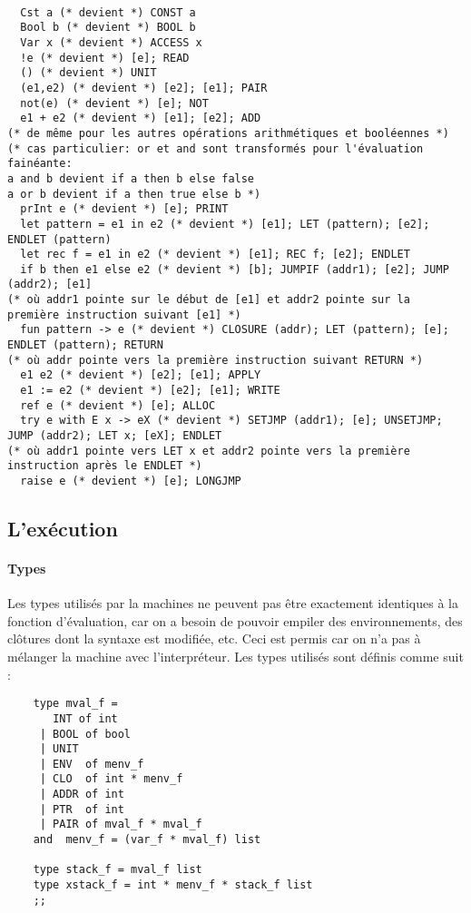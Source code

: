 \documentclass{article}
\begin{document}
\begin{verbatim}

  Cst a (* devient *) CONST a
  Bool b (* devient *) BOOL b
  Var x (* devient *) ACCESS x
  !e (* devient *) [e]; READ
  () (* devient *) UNIT
  (e1,e2) (* devient *) [e2]; [e1]; PAIR
  not(e) (* devient *) [e]; NOT
  e1 + e2 (* devient *) [e1]; [e2]; ADD
(* de même pour les autres opérations arithmétiques et booléennes *)
(* cas particulier: or et and sont transformés pour l'évaluation fainéante: 
a and b devient if a then b else false
a or b devient if a then true else b *)
  prInt e (* devient *) [e]; PRINT
  let pattern = e1 in e2 (* devient *) [e1]; LET (pattern); [e2]; ENDLET (pattern)
  let rec f = e1 in e2 (* devient *) [e1]; REC f; [e2]; ENDLET
  if b then e1 else e2 (* devient *) [b]; JUMPIF (addr1); [e2]; JUMP (addr2); [e1]
(* où addr1 pointe sur le début de [e1] et addr2 pointe sur la première instruction suivant [e1] *)
  fun pattern -> e (* devient *) CLOSURE (addr); LET (pattern); [e]; ENDLET (pattern); RETURN
(* où addr pointe vers la première instruction suivant RETURN *)
  e1 e2 (* devient *) [e2]; [e1]; APPLY
  e1 := e2 (* devient *) [e2]; [e1]; WRITE
  ref e (* devient *) [e]; ALLOC
  try e with E x -> eX (* devient *) SETJMP (addr1); [e]; UNSETJMP; JUMP (addr2); LET x; [eX]; ENDLET
(* où addr1 pointe vers LET x et addr2 pointe vers la première instruction après le ENDLET *)
  raise e (* devient *) [e]; LONGJMP

\end{verbatim}

\subsection{L'exécution}

	\paragraph{Types} Les types utilisés par la machines ne peuvent pas être exactement identiques à la fonction d'évaluation, car on a besoin de pouvoir empiler des environnements, des clôtures dont la syntaxe est modifiée, etc. Ceci est permis car on n'a pas à mélanger la machine avec l'interpréteur. Les types utilisés sont définis comme suit :
	
	\begin{verbatim}
	type mval_f =
  	   INT of int
 	 | BOOL of bool
 	 | UNIT
 	 | ENV  of menv_f
 	 | CLO  of int * menv_f
 	 | ADDR of int
  	 | PTR  of int
 	 | PAIR of mval_f * mval_f
	and  menv_f = (var_f * mval_f) list

	type stack_f = mval_f list
	type xstack_f = int * menv_f * stack_f list
	;;
	\end{verbatim}
	
\end{document}
